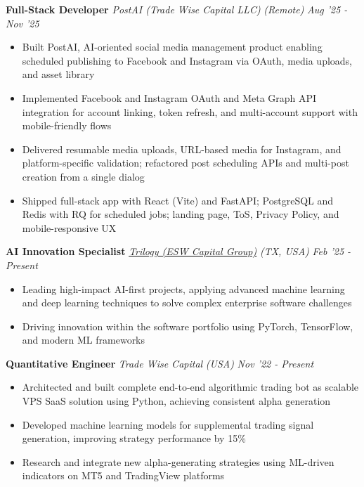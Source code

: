 \documentclass[10pt]{article}
\newenvironment{changemargin}[2]{%
  \begin{list}{}{%
    \setlength{\topsep}{0pt}%
    \setlength{\leftmargin}{#1}%
    \setlength{\rightmargin}{#2}%
    \setlength{\listparindent}{\parindent}%
    \setlength{\itemindent}{\parindent}%
    \setlength{\parsep}{\parskip}%
  }%
  \item[]}{\end{list}
}
\newenvironment{body} {
	\vspace*{-16pt}
	\begin{changemargin}{-0.6in}{-0.65in}
  }
	{\end{changemargin}
}
\begin{document}
\begin{body}
    \textbf{Full-Stack Developer} \emph{PostAI (Trade Wise Capital LLC)} \emph{(Remote)} \hfill \emph{Aug '25 - Nov '25}
    \begin{itemize}
        \item Built PostAI, AI-oriented social media management product enabling scheduled publishing to Facebook and Instagram via OAuth, media uploads, and asset library
        \item Implemented Facebook and Instagram OAuth and Meta Graph API integration for account linking, token refresh, and multi-account support with mobile-friendly flows
        \item Delivered resumable media uploads, URL-based media for Instagram, and platform-specific validation; refactored post scheduling APIs and multi-post creation from a single dialog
        \item Shipped full-stack app with React (Vite) and FastAPI; PostgreSQL and Redis with RQ for scheduled jobs; landing page, ToS, Privacy Policy, and mobile-responsive UX
    \end{itemize}
    \smallskip{}

    \textbf{AI Innovation Specialist} \href{https://home.ephor.ai}{\emph{Trilogy (ESW Capital Group)}} \emph{(TX, USA)} \hfill \emph{Feb '25 - Present}
    \begin{itemize}
        \item Leading high-impact AI-first projects, applying advanced machine learning and deep learning techniques to solve complex enterprise software challenges
        \item Driving innovation within the software portfolio using PyTorch, TensorFlow, and modern ML frameworks
    \end{itemize}
    \smallskip{}

    \textbf{Quantitative Engineer} \emph{Trade Wise Capital} \emph{(USA)} \hfill \emph{Nov '22 - Present}
    \begin{itemize}
        \item Architected and built complete end-to-end algorithmic trading bot as scalable VPS SaaS solution using Python, achieving consistent alpha generation
        \item Developed machine learning models for supplemental trading signal generation, improving strategy performance by 15\%
        \item Research and integrate new alpha-generating strategies using ML-driven indicators on MT5 and TradingView platforms
    \end{itemize}
    \smallskip{}


\end{body}
\end{document}
